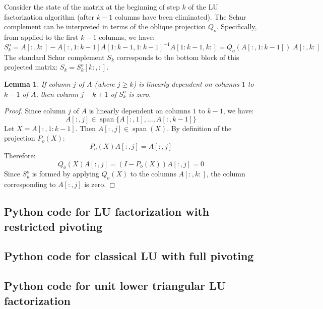 \documentclass{article}
\DeclareMathOperator{\spn}{span}
\newtheorem{lemma}{Lemma}[section]
\begin{document}
Consider the state of the matrix at the beginning of step $k$ of the LU factorization algorithm (after $k-1$ columns have been eliminated). The Schur complement can be interpreted in terms of the oblique projection $Q_o$. Specifically, from  applied to the first $k-1$ columns, we have:
\[ S^o_k = A[:,k:] - A[:,1:k-1] {A[1:k-1,1:k-1]}^{-1} A[1:k-1,k:]
    = Q_o(A[:,1:k-1]) \; A[:,k:]
\]
The standard Schur complement $S_k$ corresponds to the bottom block of this projected matrix: $S_k = S^o_k[k:,:]$.

\begin{lemma}\label{lem:oblique}
    If column $j$ of $A$ (where $j \ge k$) is linearly dependent on columns $1$ to $k-1$ of $A$, then column $j - k + 1$ of $S^o_k$ is zero.
\end{lemma}

\begin{proof}
    Since column $j$ of $A$ is linearly dependent on columns $1$ to $k-1$, we have:
    \[ A[:,j] \in \spn\{ A[:,1], \ldots, A[:,k-1] \} \] %
    Let $X = A[:,1:k-1]$. Then $A[:,j] \in \spn(X)$. By definition of the projection $P_o(X)$:
    \[ P_o(X) A[:,j] = A[:,j] \]
    Therefore:
    \[ Q_o(X) A[:,j] = (I - P_o(X)) A[:,j] = 0 \]
    Since $S^o_k$ is formed by applying $Q_o(X)$ to the columns $A[:,k:]$, the column corresponding to $A[:,j]$ is zero.
\end{proof}

\subsection{Python code for LU factorization with restricted pivoting}\label{sec:python_restricted_pivoting}



\subsection{Python code for classical LU with full pivoting}\label{sec:python_full_pivoting}



\subsection{Python code for unit lower triangular LU factorization}\label{sec:python_unit_lower}



\printbibliography
\end{document}
